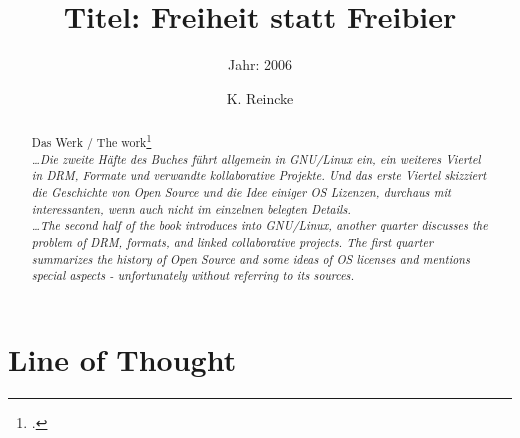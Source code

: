 \documentclass[DIV=calc,BCOR=5mm,11pt,headings=small,oneside,abstract=true, toc=bib]{scrartcl}
\begin{document}

\titlehead{Literaturexzerpt}
\subject{Autor(en): Edward Viesel}
\title{Titel: Freiheit statt Freibier}
\subtitle{Jahr: 2006 }
\author{K. Reincke}

\maketitle

\begin{abstract}
Das Werk / The work\footcite[][]{Viesel2006a} \\
\noindent \itshape
\ldots Die zweite Häfte des Buches führt allgemein in GNU/Linux ein, ein
weiteres Viertel in DRM, Formate und verwandte kollaborative Projekte. Und das
erste Viertel skizziert die Geschichte von Open Source und die Idee einiger OS
Lizenzen, durchaus mit interessanten, wenn auch nicht im einzelnen belegten
Details.
\\
\noindent
\ldots The second half of the book introduces into GNU/Linux, another quarter
discusses the problem of DRM, formats, and linked collaborative projects. The
first quarter summarizes the history of Open Source and some ideas of OS
licenses and mentions special aspects - unfortunately without referring to its
sources.
\end{abstract}
\footnotesize
\normalsize

\section{Line of Thought}
\end{document}
